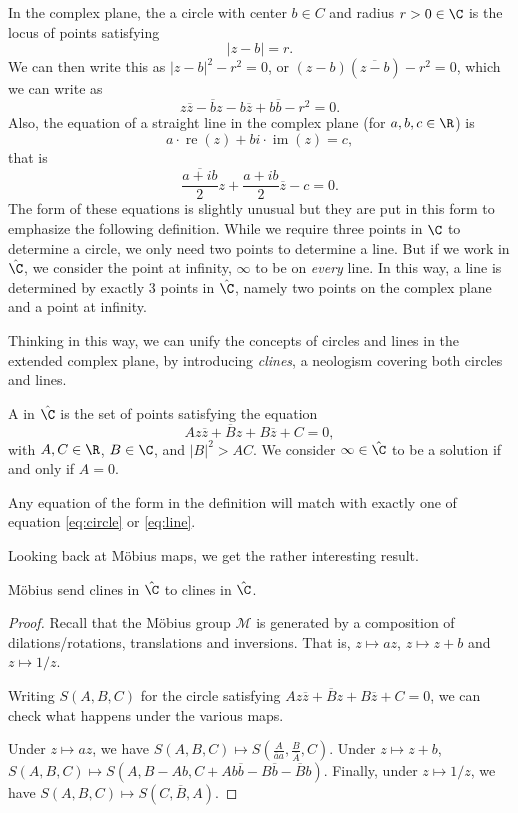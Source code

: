 \documentclass[a4paper]{scrartcl}
\begin{document}
In the complex plane, the a circle with center $b \in C$ and radius $r > 0 \in \C$ is the locus of points satisfying
$$
|z - b| = r.
$$
We can then write this as $|z - b|^2 - r^2 = 0$, or $(z - b)(\overline{z - b}) - r^2 = 0$, which we can write as
\begin{equation}\label{eq:circle}
	z \overline{z} - \overline{b}z - b \overline{z} + b \overline{b} - r^2 = 0.
	\tag{$*$}
\end{equation}
Also, the equation of a straight line in the complex plane (for $a, b, c \in \R$) is
$$
	a \cdot \operatorname{re}(z) + bi \cdot \operatorname{im}(z) = c,
$$
that is
\begin{equation}\label{eq:line}
\frac{\overline{a + i b}}{2}z + \frac{a + ib}{2} \overline{z} - c = 0.
\tag{$\dagger$}	
\end{equation}
The form of these equations is slightly unusual but they are put in this form to emphasize the following definition.
While we require three points in $\C$ to determine a circle, we only need two points to determine a line. But if we work in $\hat{\C}$, we consider the point at infinity, $\infty$ to be on \emph{every} line. In this way, a line is determined by exactly 3 points in $\hat{\C}$, namely two points on the complex plane and a point at infinity.

Thinking in this way, we can unify the concepts of circles and lines in the extended complex plane, by introducing \emph{clines}, a neologism covering both circles and lines. 

\begin{definition}
A  in $\hat{\C}$ is the set of points satisfying the equation
$$
A z \overline{z} + \overline{B}z + B \overline{z} + C = 0,
$$
with $A, C \in \R$, $B \in \C$, and $|B|^2 > AC$. We consider $\infty \in \hat{\C}$ to be a solution if and only if $A = 0$.  
\end{definition}

Any equation of the form in the definition will match with exactly one of equation \eqref{eq:circle} or \eqref{eq:line}.

Looking back at Möbius maps, we get the rather interesting result.
\begin{theorem}
	Möbius send clines in $\hat{\C}$ to clines in $\hat{\C}$.
\end{theorem}
\begin{proof}
	Recall that the Möbius group $\mathcal{M}$ is generated by a composition of dilations/rotations, translations and inversions. That is, $z \mapsto az$, $z \mapsto z + b$ and $z \mapsto 1/z$.

	Writing $S(A, B, C)$ for the circle satisfying $A z \overline{z} + \overline{B}z + B \overline{z} + C = 0$, we can check what happens under the various maps.

	Under $z \mapsto az$, we have $S(A, B, C) \mapsto S\left(\frac{A}{\overline{a}a}, \frac{B}{\overline{A}}, C\right)$. Under $z \mapsto z + b$, $S(A, B, C) \mapsto S(A, B - Ab, C + A b \overline{b} - B \overline{b} - \overline{B} b)$. Finally, under $z \mapsto 1/z$, we have $S(A, B, C) \mapsto S(C, \overline{B}, A)$.
\end{proof}
\end{document}
